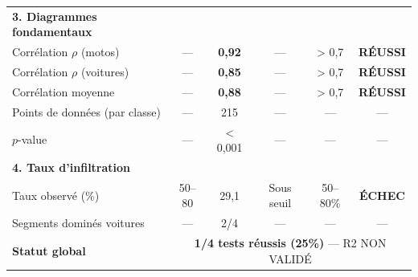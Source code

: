 \begin{table}[H]
\begin{tabular}{|l|c|c|c|c|c|}
        \hline
        \textbf{3. Diagrammes fondamentaux}  &                                                                        &                       &                 &                &                                     \\
        \quad Corrélation $\rho$ (motos)     & —                                                                      & \textbf{0,92}         & —               & > 0,7          & \cellcolor{green!30}\textbf{RÉUSSI} \\
        \quad Corrélation $\rho$ (voitures)  & —                                                                      & \textbf{0,85}         & —               & > 0,7          & \cellcolor{green!30}\textbf{RÉUSSI} \\
        \quad Corrélation moyenne            & —                                                                      & \textbf{0,88}         & —               & > 0,7          & \cellcolor{green!30}\textbf{RÉUSSI} \\
        \quad Points de données (par classe) & —                                                                      & 215                   & —               & —              & —                                   \\
        \quad $p$-value                      & —                                                                      & < 0,001               & —               & —              & —                                   \\
        \hline
        \textbf{4. Taux d'infiltration}      &                                                                        &                       &                 &                &                                     \\
        \quad Taux observé (\%)              & 50--80                                                                 & 29,1                  & Sous seuil      & 50--80\%       & \cellcolor{red!30}\textbf{ÉCHEC}    \\
        \quad Segments dominés voitures      & —                                                                      & 2/4                   & —               & —              & —                                   \\
        \hline
        \hline
        \textbf{Statut global}               & \multicolumn{5}{c|}{\textbf{1/4 tests réussis (25\%)} — R2 NON VALIDÉ}                                                                                                  \\
        \hline
    \end{tabular}
\end{table}

